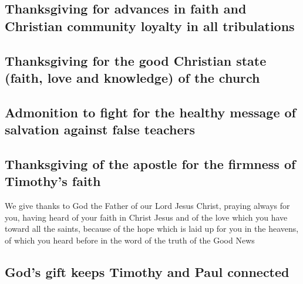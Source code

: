 \hypertarget{thanksgiving-for-advances-in-faith-and-christian-community-loyalty-in-all-tribulations}{%
\subsection{Thanksgiving for advances in faith and Christian community
loyalty in all
tribulations}\label{thanksgiving-for-advances-in-faith-and-christian-community-loyalty-in-all-tribulations}}

\hypertarget{thanksgiving-for-the-good-christian-state-faith-love-and-knowledge-of-the-church}{%
\subsection{Thanksgiving for the good Christian state (faith, love and
knowledge) of the
church}\label{thanksgiving-for-the-good-christian-state-faith-love-and-knowledge-of-the-church}}

\hypertarget{admonition-to-fight-for-the-healthy-message-of-salvation-against-false-teachers}{%
\subsection{Admonition to fight for the healthy message of salvation
against false
teachers}\label{admonition-to-fight-for-the-healthy-message-of-salvation-against-false-teachers}}

\hypertarget{thanksgiving-of-the-apostle-for-the-firmness-of-timothys-faith}{%
\subsection{Thanksgiving of the apostle for the firmness of Timothy's
faith}\label{thanksgiving-of-the-apostle-for-the-firmness-of-timothys-faith}}

 We give thanks to God the Father of our Lord Jesus
Christ, praying always for you,  having heard of your
faith in Christ Jesus and of the love which you have toward all the
saints,  because of the hope which is laid up for you in
the heavens, of which you heard before in the word of the truth of the
Good News

\hypertarget{gods-gift-keeps-timothy-and-paul-connected}{%
\subsection{God's gift keeps Timothy and Paul
connected}\label{gods-gift-keeps-timothy-and-paul-connected}}


